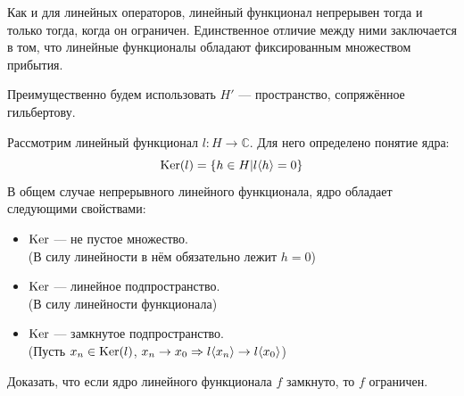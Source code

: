 \documentclass[12pt]{article}
\begin{document}
	Как и для линейных операторов, линейный функционал непрерывен тогда и только тогда, когда он ограничен. Единственное отличие
	между ними заключается в том, что линейные функционалы обладают фиксированным множеством прибытия.
	
	Преимущественно будем использовать $H'$ --- пространство, сопряжённое гильбертову.
	
	Рассмотрим линейный функционал $l: H \rightarrow \mathbb{C}$. Для него определено понятие ядра:
	$$\text{Ker}(l) = \{ h \in H | l \langle h \rangle = 0\}$$
	В общем случае непрерывного линейного функционала, ядро обладает следующими свойствами:
	\begin{itemize}
		\item $\text{Ker}$ --- не пустое множество. \\
		(В силу линейности в нём обязательно лежит $h = 0$)
		\item $\text{Ker}$ --- линейное подпространство. \\
		(В силу линейности функционала)
		\item $\text{Ker}$ --- замкнутое подпространство. \\
		(Пусть $x_n \in \text{Ker}(l)$, $x_n \rightarrow x_0 \Rightarrow l\langle x_n \rangle \rightarrow l\langle x_0 \rangle$)
	\end{itemize}
	
	\exc Доказать, что если ядро линейного функционала $f$ замкнуто, то $f$ ограничен.
	
\end{document}
